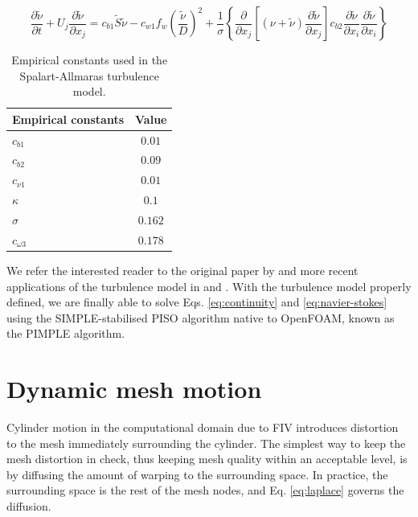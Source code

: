\documentclass[oneside]{utmthesis}
\begin{document}
\begin{equation}
  \label{eq:kineticEddyTransport}
  \frac{\partial \tilde{\nu}}{\partial t} + U_{j} \frac{\partial \tilde{\nu}}{\partial x_{j}} = c_{b1}\tilde{S}\tilde{\nu} - c_{w1} f_{w} \left( \frac{\tilde{\nu}}{D} \right)^{2} + \frac{1}{\sigma} \left\{ \frac{\partial}{\partial x_{j}} \left[ \left( \nu + \tilde{\nu} \right) \frac{\partial \tilde{\nu}}{\partial x_{j}} \right] c_{b2} \frac{\partial \tilde{\nu}}{\partial x_{i}} \frac{\partial \tilde{\nu}}{\partial x_{i}} \right\}
\end{equation}

\begin{table}[!ht]
\centering
\caption{Empirical constants used in the Spalart-Allmaras turbulence model.} \label{tab:spalart-Allmaras}
\vspace{\baselineskip}
\begin{tabular}{l c}
  \hline
  \hline

  Empirical constants & Value    \\
  \hline

  $c_{b1}$            & $0.01$   \\
  $c_{b2}$            & $0.09$   \\
  $c_{\nu1}$          & $0.01$   \\
  $\kappa$            & $0.1$    \\
  $\sigma$            & $0.162$  \\
  $c_{\omega3}$       & $0.178$  \\
  \hline
  \hline
\end{tabular}
\end{table}

\noindent We refer the interested reader to the original paper by \citet{Spalart1992} and more recent applications of the turbulence model in \citet{Ding2019} and \citet{Sun2019b}. With the turbulence model properly defined, we are finally able to solve Eqs. \ref{eq:continuity} and \ref{eq:navier-stokes} using the SIMPLE-stabilised PISO algorithm native to OpenFOAM, known as the PIMPLE algorithm. 

\section{Dynamic mesh motion} \label{sec:dynMesh}

Cylinder motion in the computational domain due to FIV introduces distortion to the mesh immediately surrounding the cylinder. The simplest way to keep the mesh distortion in check, thus keeping mesh quality within an acceptable level, is by diffusing the amount of warping to the surrounding space. In practice, the surrounding space is the rest of the mesh nodes, and Eq. \ref{eq:laplace} governs the diffusion.
\end{document}
